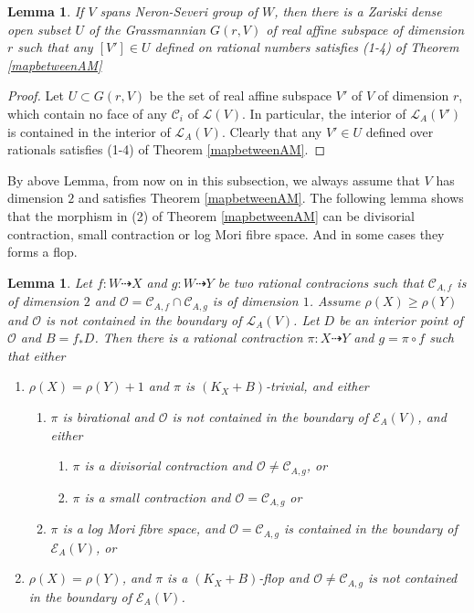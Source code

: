 \documentclass[11pt]{amsart}
\newtheorem{lem}[defn]{Lemma}
\begin{document}
\begin{lem}\label{subspace}
  \cite[Corollary 3.4]{haconSarkisovProgram2012} If $V$ spans  Neron-Severi group of $W$, then there is a Zariski dense open subset $U$ of the Grassmannian $G(r,V)$ of real affine subspace of dimension $r$ such that any  $[V']\in U$ defined on rational numbers satisfies (1-4) of Theorem \ref{mapbetweenAM} 
\end{lem}

\begin{proof}
 Let $U \subset G(r,V) $ be the set of real affine subspace  $V'$ of $V$ of dimension $r$, which contain no face of any $\mathcal{C}_{i}$ of $\mathcal{L}(V)$. In particular, the interior of  $\mathcal{L}_{A}(V')$ is contained in the interior of $\mathcal{L}_{A}(V)$. Clearly that any $V'\in U$ defined over rationals satisfies (1-4) of Theorem \ref{mapbetweenAM}. 
\end{proof}

By above Lemma, from now on in this subsection, we always assume that $V$ has dimension $2$ and satisfies Theorem \ref{mapbetweenAM}. The following lemma shows that the morphism in (2) of Theorem \ref{mapbetweenAM} can be divisorial contraction, small contraction or log Mori fibre space. And in some cases they forms a flop.

\begin{lem}\label{mapbetweenAM2}
\cite[Lemma 3.5]{haconSarkisovProgram2012} Let $ f:W\dashrightarrow X $ and $ g:W\dashrightarrow  Y $ be two rational contracions such that $ \mathcal{C}_{A,f} $ is of dimension $ 2 $ and $ \mathcal{O}=\mathcal{C}_{A,f}\cap \mathcal{C}_{A,g} $ is of dimension $ 1 $. Assume $ \rho(X)\geqslant \rho(Y) $ and $ \mathcal{O} $ is not contained in the boundary of $ \mathcal{L}_{A}(V) $. Let $ D $ be an interior point of $ \mathcal{O} $ and $ B=f_*D $. Then there is a rational contraction $ \pi:X\dashrightarrow Y $ and $ g=\pi\circ f $ such that either
\begin{enumerate}
  \item $ \rho(X)=\rho(Y)+1 $ and $ \pi  $ is $ (K_X+B) $-trivial, and either
  \begin{enumerate}
    \item $ \pi $ is birational and $ \mathcal{O} $ is not contained in the boundary of $ \mathcal{E}_A(V) $, and either
    \begin{enumerate}
      \item $ \pi $ is a divisorial contraction and $ \mathcal{O}\neq \mathcal{C}_{A,g} $, or
      \item $ \pi $ is a small contraction and $ \mathcal{O}= \mathcal{C}_{A,g} $ or
    \end{enumerate}
    \item $ \pi $ is a log Mori fibre space, and $ \mathcal{O}=\mathcal{C}_{A,g} $ is contained in the boundary of $ \mathcal{E}_{A}(V) $, or
  \end{enumerate}
  \item $ \rho(X)=\rho(Y) $, and $ \pi $ is  a $ (K_X+B) $-flop and $ \mathcal{O}\neq\mathcal{C}_{A,g} $ is not contained in the boundary of $ \mathcal{E}_A(V) $.
  \end{enumerate}
\end{lem}
\end{document}
